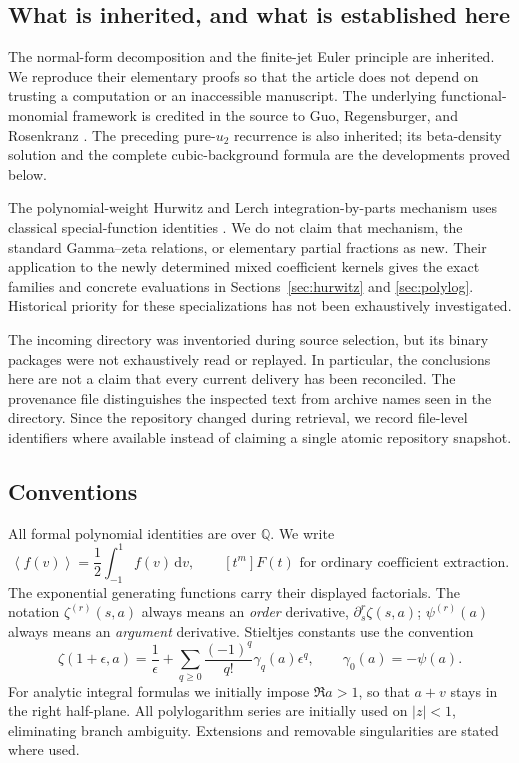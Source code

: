 \documentclass[11pt]{article}
\numberwithin{equation}{section}
\theoremstyle{definition}\newtheorem{definition}[theorem]{Definition}
\theoremstyle{remark}\newtheorem{remark}[theorem]{Remark}
\newcommand{\Q}{\mathbb Q}\newcommand{\C}{\mathbb C}
\newcommand{\avg}[1]{\left\langle #1\right\rangle}
\newcommand{\dd}{\,\mathrm d}
\begin{document}
\subsection{What is inherited, and what is established here}
The normal-form decomposition and the finite-jet Euler principle are
inherited. We reproduce their elementary proofs so that the article does
not depend on trusting a computation or an inaccessible manuscript.
The underlying functional-monomial framework is credited in the source to
Guo, Regensburger, and Rosenkranz \cite{GRR}. The preceding pure-$u_2$
recurrence is also inherited; its beta-density solution and the complete
cubic-background formula are the developments proved below.

The polynomial-weight Hurwitz and Lerch integration-by-parts mechanism
uses classical special-function identities \cite{DLMF25,DLMF14}. We do not
claim that mechanism, the standard Gamma--zeta relations, or elementary
partial fractions as new. Their application to the newly determined mixed
coefficient kernels gives the exact families and concrete evaluations in
Sections~\ref{sec:hurwitz} and \ref{sec:polylog}. Historical priority for
these specializations has not been exhaustively investigated.

The incoming directory was inventoried during source selection, but its
binary packages were not exhaustively read or replayed. In particular,
the conclusions here are not a claim that every current delivery has been
reconciled. The provenance file distinguishes the inspected text from
archive names seen in the directory. Since the repository changed during
retrieval, we record file-level identifiers where available instead of
claiming a single atomic repository snapshot.

\subsection{Conventions}
All formal polynomial identities are over $\Q$. We write
\[
 \avg{f(v)}=\frac12\int_{-1}^1f(v)\dd v,
 \qquad [t^m]F(t)\text{ for ordinary coefficient extraction}.
\]
The exponential generating functions carry their displayed factorials.
The notation $\zeta^{(r)}(s,a)$ always means an \emph{order} derivative,
$\partial_s^r\zeta(s,a)$; $\psi^{(r)}(a)$ always means an \emph{argument}
derivative. Stieltjes constants use the convention
\begin{equation}\label{eq:stieltjes-convention}
 \zeta(1+\epsilon,a)=\frac1\epsilon+
 \sum_{q\ge0}\frac{(-1)^q}{q!}\gamma_q(a)\epsilon^q,
 \qquad \gamma_0(a)=-\psi(a).
\end{equation}
For analytic integral formulas we initially impose $\Re a>1$, so that
$a+v$ stays in the right half-plane. All polylogarithm series are initially
used on $|z|<1$, eliminating branch ambiguity. Extensions and removable
singularities are stated where used.
\end{document}
